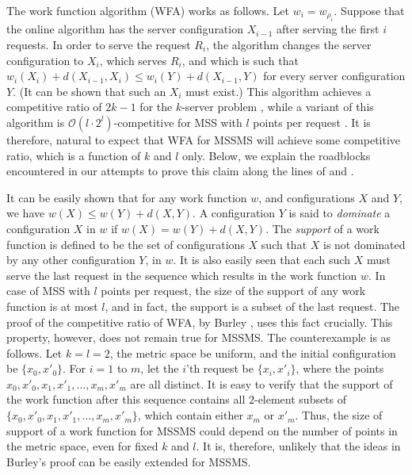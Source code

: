 \documentclass[11pt]{article}
\theoremstyle{plain}\newtheorem{theorem}{Theorem}
\theoremstyle{definition}
\theoremstyle{remark}
\begin{document}
The work function algorithm (WFA) works as follows. Let $w_i=w_{\rho_i}$. Suppose that the online algorithm has the server configuration $X_{i-1}$ after serving the first $i$ requests. In order to serve the request $R_i$, the algorithm changes the server configuration to $X_i$, which serves $R_i$, and which is such that $w_i(X_i)+d(X_{i-1},X_i)\leq w_i(Y)+d(X_{i-1},Y)$ for every server configuration $Y$. (It can be shown that such an $X_i$ must exist.) This algorithm achieves a competitive ratio of $2k-1$ for the $k$-server problem \cite{KoutsoupiasP95}, while a variant of this algorithm is $\mathcal{O}(l\cdot2^l)$-competitive for MSS with $l$ points per request \cite{Burley96}. It is therefore, natural to expect that WFA for MSSMS will achieve some competitive ratio, which is a function of $k$ and $l$ only. Below, we explain the roadblocks encountered in our attempts to prove this claim along the lines of \cite{Burley96} and \cite{KoutsoupiasP95}.

It can be easily shown that for any work function $w$, and configurations $X$ and $Y$, we have $w(X)\leq w(Y)+d(X,Y)$. A configuration $Y$ is said to \textit{dominate} a configuration $X$ in $w$ if $w(X)=w(Y)+d(X,Y)$. The \textit{support} of a work function is defined to be the set of configurations $X$ such that $X$ is not dominated by any other configuration $Y$, in $w$. It is also easily seen that each such $X$ must serve the last request in the sequence which results in the work function $w$. In case of MSS with $l$ points per request, the size of the support of any work function is at most $l$, and in fact, the support is a subset of the last request. The proof of the competitive ratio of WFA, by Burley \cite{Burley96}, uses this fact crucially. This property, however, does not remain true for MSSMS. The counterexample is as follows. Let $k=l=2$, the metric space be uniform, and the initial configuration be $\{x_0,x'_0\}$. For $i=1$ to $m$, let the $i$'th request be $\{x_i,x'_i\}$, where the points $x_0,x'_0,x_1,x'_1,\ldots,x_m,x'_m$ are all distinct. It is easy to verify that the support of the work function after this sequence contains all $2$-element subsets of $\{x_0,x'_0,x_1,x'_1,\ldots,x_m,x'_m\}$, which contain either $x_m$ or $x'_m$. Thus, the size of support of a work function for MSSMS could depend on the number of points in the metric space, even for fixed $k$ and $l$. It is, therefore, unlikely that the ideas in Burley's proof can be easily extended for MSSMS.
\end{document}
